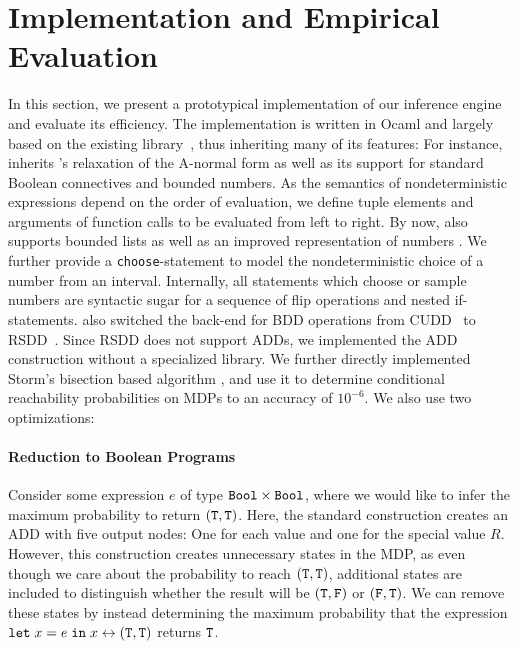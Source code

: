 



\section{Implementation and Empirical Evaluation}\label{sec:implementation}
In this section, we present a prototypical implementation of our inference engine and evaluate its efficiency.
The implementation is written in Ocaml and largely based on the existing \DICE library~\cite{holtzen2020scaling}, thus inheriting many of its features:
For instance, \NDICE inherits \DICE's relaxation of the A-normal form as well as its support for standard Boolean connectives and bounded numbers.
As the semantics of nondeterministic expressions depend on the order of evaluation, we define tuple elements and arguments of function calls to be evaluated from left to right.
By now, \DICE also supports bounded lists as well as an improved representation of numbers \cite{cao2023scaling}. 
We further provide a \texttt{choose}-statement to model the nondeterministic choice of a number from an interval.
Internally, all statements which choose or sample numbers are syntactic sugar for a sequence of flip operations and nested if-statements.
\DICE also switched the back-end for BDD operations from CUDD~\cite{somenzi2009cudd} to RSDD~\cite{RSDD}.
Since RSDD does not support ADDs, we implemented the ADD construction without a specialized library.
We further directly implemented Storm's bisection based algorithm \citeBisection, and use it to determine conditional reachability probabilities on MDPs to an accuracy of $10^{-6}$. 
We also use two optimizations:
 
 
 \paragraph{Reduction to Boolean Programs}
 Consider some \NDICE expression $e$ of type $\texttt{Bool} \times \texttt{Bool}$, where we would like to infer the maximum probability to return $(\texttt{T}, \texttt{T})$.
 Here, the standard construction creates an ADD with five output nodes: One for each value and one for the special value $R$.
 However, this construction creates unnecessary states in the MDP, as even though we care about the probability to reach $(\texttt{T}, \texttt{T})$, additional states are included to distinguish whether the result will be $(\texttt{T}, \texttt{F})$ or $(\texttt{F}, \texttt{T})$.
 We can remove these states by instead determining the maximum probability that the expression $\texttt{let}\; x = e \;\texttt{in}\; x \leftrightarrow (\texttt{T}, \texttt{T})$ returns $\texttt{T}$.

